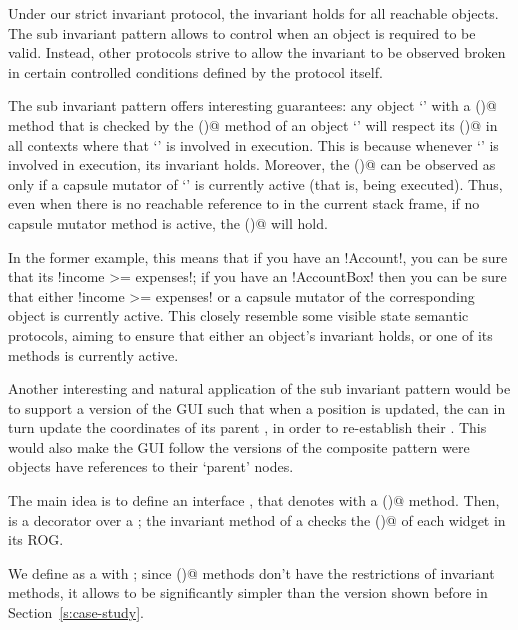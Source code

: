 Under our strict invariant protocol, the invariant holds for all reachable objects.
The sub invariant pattern allows to control when an object is required to be valid.
Instead, other protocols strive to allow the invariant to be observed broken in certain controlled conditions defined by the protocol itself.

The sub invariant pattern offers interesting guarantees:
any object `\Q@a@' with a \Q@subInvariant()@ method that is checked by the \Q@invariant()@ method of an object `\Q@b@'
will respect its \Q@subInvariant()@ in all contexts where that `\Q@b@' is involved in execution.
This is because whenever `\Q@b@' is involved in execution, its invariant holds.
Moreover, the \Q@a@ \Q@subInvariant()@ can be observed as \Q@false@ only if a capsule mutator of `\Q@b@' is currently active (that is, being executed).
Thus, even when there is no reachable reference to \Q@b@ in the current stack frame,
if no \Q@b@ capsule mutator method is active, the \Q@a@ \Q@subInvariant()@ will hold.

In the former example, this means that
if you have an \Q!Account!, you can be sure that its \Q!income >= expenses!;
if you have an \Q!AccountBox! then you can be sure that either \Q!income >= expenses! or 
a capsule mutator of the corresponding \Q@Account@ object is currently active.
This closely resemble some visible state semantic protocols, aiming to ensure that  
either an object's invariant holds, or one of its methods is currently active.


Another interesting and natural application of the sub invariant pattern would be to support a version of the GUI such that when a \Q@Widget@s position is updated, the \Q@Widget@ can in turn update the coordinates of its parent \Q@Widget@s, in order to re-establish their \Q@subInvariants@.
This would also make the GUI follow the versions of the composite pattern were objects have references to their `parent' nodes.

The main idea is to define an interface \Q@HasSubInvariant@, that denotes \Q@Widgets@ with a \Q@subInvariant()@ method. Then, \Q@WidgetWithInvariant@ is a decorator over a \Q@Widget@; the invariant method of a \Q@WidgetWithInvariant@ checks the \Q@subInvariant()@ of each widget in its ROG.

We define \Q@SafeMovable@ as a \Q@Widget@ with \Q@HasSubInvariant@; since \Q@subInvariant()@ methods don't have the restrictions of invariant methods, it allows \Q@SafeMovable\@ to be significantly simpler than the version shown before in Section~\ref{s:case-study}.

